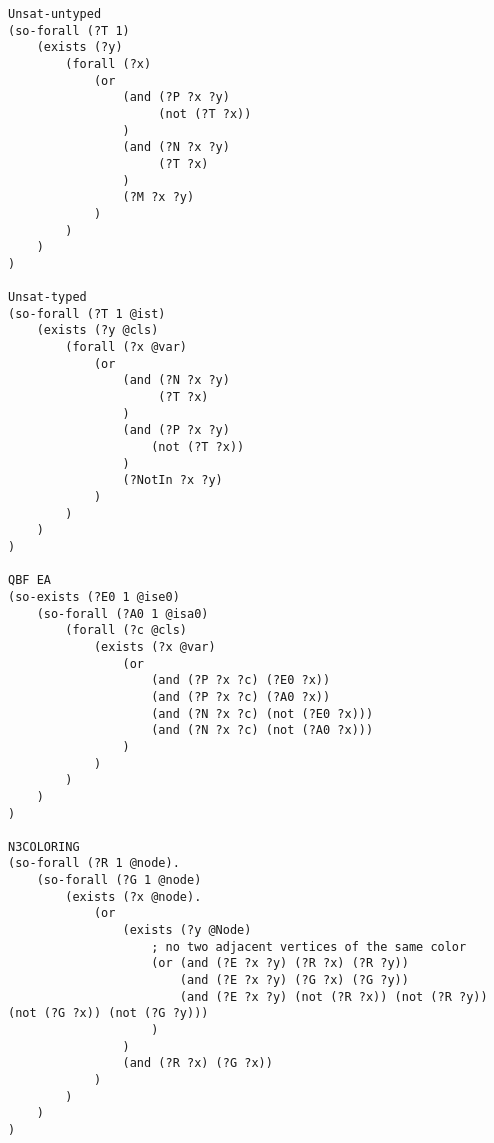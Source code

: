 \begin{verbatim}
Unsat-untyped
(so-forall (?T 1)
    (exists (?y)
        (forall (?x)
            (or
                (and (?P ?x ?y)
                     (not (?T ?x))
                )
                (and (?N ?x ?y)
                     (?T ?x)
                )
				(?M ?x ?y)
            )
        )
    )
)

Unsat-typed
(so-forall (?T 1 @ist)
    (exists (?y @cls)
        (forall (?x @var)
            (or
                (and (?N ?x ?y)
                     (?T ?x)
                )
                (and (?P ?x ?y)
                    (not (?T ?x))
                )
                (?NotIn ?x ?y)
            )
        )
    )
)     

QBF EA
(so-exists (?E0 1 @ise0)
    (so-forall (?A0 1 @isa0)
        (forall (?c @cls)
            (exists (?x @var)
                (or
                    (and (?P ?x ?c) (?E0 ?x))
                    (and (?P ?x ?c) (?A0 ?x))
                    (and (?N ?x ?c) (not (?E0 ?x)))
                    (and (?N ?x ?c) (not (?A0 ?x)))
                )
            )
        )
    )
)

N3COLORING
(so-forall (?R 1 @node).
    (so-forall (?G 1 @node)
        (exists (?x @node).
            (or 
                (exists (?y @Node)
                    ; no two adjacent vertices of the same color
                    (or (and (?E ?x ?y) (?R ?x) (?R ?y))
                        (and (?E ?x ?y) (?G ?x) (?G ?y))
                        (and (?E ?x ?y) (not (?R ?x)) (not (?R ?y)) (not (?G ?x)) (not (?G ?y)))
                    )   
                )   
                (and (?R ?x) (?G ?x))
            )   
        )   
    )      
)
\end{verbatim}
